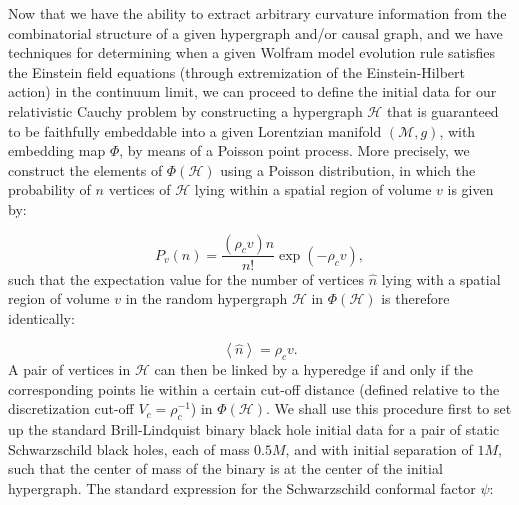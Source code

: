 \documentclass{article}
\begin{document}
Now that we have the ability to extract arbitrary curvature information from the combinatorial structure of a given hypergraph and/or causal graph, and we have techniques for determining when a given Wolfram model evolution rule satisfies the Einstein field equations (through extremization of the Einstein-Hilbert action) in the continuum limit, we can proceed to define the initial data for our relativistic Cauchy problem by constructing a hypergraph ${\mathcal{H}}$ that is guaranteed to be faithfully embeddable into a given Lorentzian manifold ${\left( \mathcal{M}, g \right)}$, with embedding map ${\Phi}$, by means of a Poisson point process. More precisely, we construct the elements of ${\Phi \left( \mathcal{H} \right)}$ using a Poisson distribution, in which the probability of $n$ vertices of ${\mathcal{H}}$ lying within a spatial region of volume $v$ is given by:

\begin{equation}
P_{v} \left( n \right) = \frac{\left( \rho_c v \right)n}{n!} \exp \left( - \rho_c v \right),
\end{equation}
such that the expectation value for the number of vertices ${\hat{n}}$ lying with a spatial region of volume $v$ in the random hypergraph ${\mathcal{H}}$ in ${\Phi \left( \mathcal{H} \right)}$ is therefore identically:

\begin{equation}
\left\langle \hat{n} \right\rangle = \rho_c v.
\end{equation}
A pair of vertices in ${\mathcal{H}}$ can then be linked by a hyperedge if and only if the corresponding points lie within a certain cut-off distance (defined relative to the discretization cut-off ${V_c = \rho_{c}^{-1}}$) in ${\Phi \left( \mathcal{H} \right)}$. We shall use this procedure first to set up the standard Brill-Lindquist binary black hole initial data for a pair of static Schwarzschild black holes, each of mass ${0.5 M}$, and with initial separation of ${1 M}$, such that the center of mass of the binary is at the center of the initial hypergraph. The standard expression for the Schwarzschild conformal factor ${\psi}$:
\end{document}
